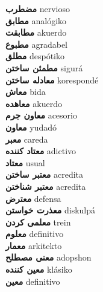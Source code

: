 \textbf{ مضطرب  } nervioso \\
\textbf{ مطابق  } analógiko \\
\textbf{ مطابقت  } akuerdo \\
\textbf{ مطبوع  } agradabel \\
\textbf{ مطلق  } despótiko \\
\textbf{ مطمئن ساختن  } sigurá \\
\textbf{ معادله ساختن  } korespondé \\
\textbf{ معاش  } bida \\
\textbf{ معاهده  } akuerdo \\
\textbf{ معاون جرم  } acesorio \\
\textbf{ معاون  } yudadó \\
\textbf{ معبر  } careda \\
\textbf{ معتاد کننده  } adictivo \\
\textbf{ معتاد  } usual \\
\textbf{ معتبر ساختن  } acredita \\
\textbf{ معتبر شناختن  } acredita \\
\textbf{ معترض  } defensa \\
\textbf{ معذرت خواستن  } diskulpá \\
\textbf{ معلمی کردن  } trein \\
\textbf{ معلوم  } definitivo \\
\textbf{ معمار  } arkitekto \\
\textbf{ معنی مصطلح  } adopshon \\
\textbf{ معین کننده  } klásiko \\
\textbf{ معین  } definitivo \\
